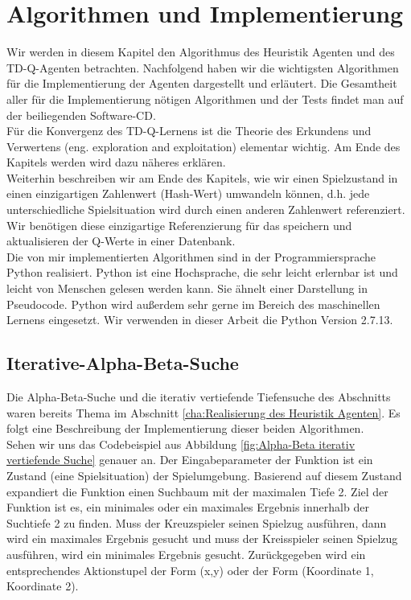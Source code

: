 \chapter{Algorithmen und Implementierung}
\label{cha:Algorithmen und Implementierung}

Wir werden in diesem Kapitel den Algorithmus des Heuristik Agenten und des TD-Q-Agenten betrachten. Nachfolgend haben wir die wichtigsten Algorithmen für die Implementierung der Agenten dargestellt und erläutert. Die Gesamtheit aller für die Implementierung nötigen Algorithmen und der Tests findet man auf der beiliegenden Software-CD. \\

Für die Konvergenz des TD-Q-Lernens ist die Theorie des Erkundens und Verwertens (eng. exploration and exploitation) elementar wichtig. Am Ende des Kapitels werden wird dazu näheres erklären. \\

Weiterhin beschreiben wir am Ende des Kapitels, wie wir einen Spielzustand in einen einzigartigen Zahlenwert (Hash-Wert) umwandeln können, d.h. jede unterschiedliche Spielsituation wird durch einen anderen Zahlenwert referenziert. Wir benötigen diese einzigartige Referenzierung für das speichern und aktualisieren der Q-Werte in einer Datenbank. \\

Die von mir implementierten Algorithmen sind in der Programmiersprache Python realisiert. Python ist eine Hochsprache, die sehr leicht erlernbar ist und leicht von Menschen gelesen werden kann. Sie ähnelt einer Darstellung in Pseudocode. Python wird außerdem sehr gerne im Bereich des maschinellen Lernens eingesetzt. Wir verwenden in dieser Arbeit die Python Version 2.7.13. \\

\section{Iterative-Alpha-Beta-Suche}
Die Alpha-Beta-Suche und die iterativ vertiefende Tiefensuche des Abschnitts waren bereits Thema im Abschnitt \ref{cha:Realisierung des Heuristik Agenten}. Es folgt eine Beschreibung der Implementierung dieser beiden Algorithmen.\\

Sehen wir uns das Codebeispiel aus Abbildung \ref{fig:Alpha-Beta iterativ vertiefende Suche} genauer an. Der Eingabeparameter der Funktion ist ein Zustand (eine Spielsituation) der Spielumgebung. Basierend auf diesem Zustand expandiert die Funktion einen Suchbaum mit der maximalen Tiefe 2. Ziel der Funktion ist es, ein minimales oder ein maximales Ergebnis innerhalb der Suchtiefe 2 zu finden. Muss der Kreuzspieler seinen Spielzug ausführen, dann wird ein maximales Ergebnis gesucht und muss der Kreisspieler seinen Spielzug ausführen, wird ein minimales Ergebnis gesucht. Zurückgegeben wird ein entsprechendes Aktionstupel der Form (x,y) oder der Form (Koordinate 1, Koordinate 2). \\

